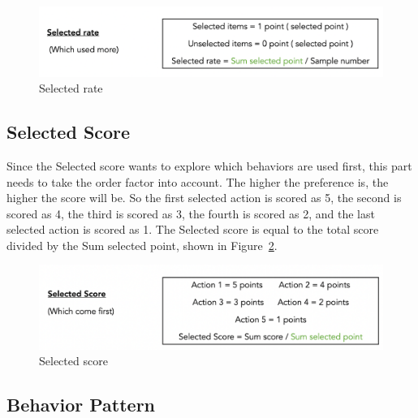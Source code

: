 \begin{figure}[h]
  \includegraphics[width=\linewidth]{Figure/Figure10.png}
  \centering
  \caption{Selected rate }
  \label{fig10}
\end{figure}

\subsection{Selected Score}

Since the Selected score wants to explore which behaviors are used first, this part needs to take the order factor into account. The higher the preference is, the higher the score will be. So the first selected action is scored as 5, the second is scored as 4, the third is scored as 3, the fourth is scored as 2, and the last selected action is scored as 1. The Selected score is equal to the total score divided by the Sum selected point, shown in Figure~\ref{fig11}.

\begin{figure}[h]
  \includegraphics[width=\linewidth]{Figure/Figure11.png}
  \centering
  \caption{Selected score}
  \label{fig11}
\end{figure}

\subsection{Behavior Pattern}

